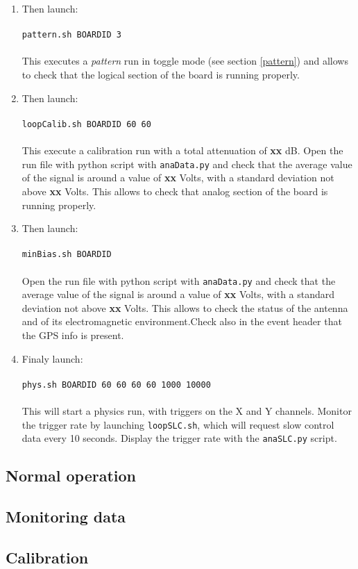 \begin{enumerate}[-]
%
\item{Then launch:\\
\ \\
\texttt{pattern.sh BOARDID 3} \\
\ \\
This executes a {\it pattern} run in toggle mode (see section \ref{pattern}) and allows to check that the logical section of the board is running properly.}
%
\item{Then launch: \\
\ \\
\texttt{loopCalib.sh BOARDID 60 60} \\
\ \\
This execute a calibration run with a total attenuation of {\bf xx} dB. Open the run file with python script with \texttt{anaData.py} and check that the average value of the signal is around a value of {\bf xx} Volts, with a standard deviation not above {\bf xx} Volts. This allows to check that analog section of the board is running properly. }
%
\item{Then launch: \\
\ \\
\texttt{minBias.sh BOARDID} \\
\ \\
Open the run file with python script with \texttt{anaData.py} and check that the average value of the signal is around a value of {\bf xx} Volts, with a standard deviation not above {\bf xx} Volts. This allows to check the status of the antenna and of its electromagnetic environment.Check also in the event header that the GPS info is present.}
%
\item{Finaly launch: \\
\ \\
\texttt{phys.sh BOARDID 60 60 60 60 1000 10000} \\
\ \\
This will start a physics run, with triggers on the X and Y channels. Monitor the trigger rate by launching \texttt{loopSLC.sh}, which will request slow control data every 10 seconds. Display the trigger rate with the \texttt{anaSLC.py} script.}
\end{enumerate} 

\subsection{Normal operation}

\subsection{Monitoring data}

\subsection{Calibration}
